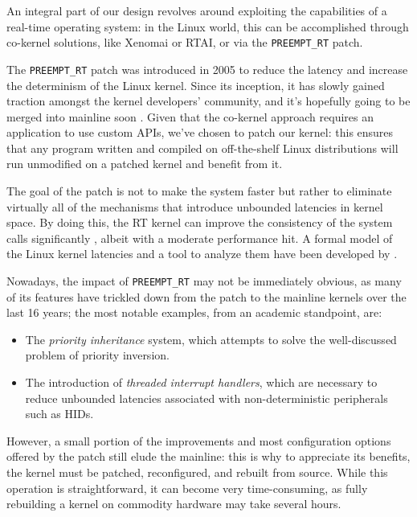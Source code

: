 \documentclass[a4paper,12pt]{report}
\begin{document}
An integral part of our design revolves around exploiting the capabilities of a real-time operating system: in the Linux world, this can be accomplished through co-kernel solutions, like Xenomai or RTAI, or via the \texttt{PREEMPT\_RT} patch.

The \texttt{PREEMPT\_RT} patch was introduced in 2005 to reduce the latency and increase the determinism of the Linux kernel. Since its inception, it has slowly gained traction amongst the kernel developers' community, and it's hopefully going to be merged into mainline soon \cite{lwn-rt-future}. Given that the co-kernel approach requires an application to use custom APIs, we've chosen to patch our kernel: this ensures that any program written and compiled on off-the-shelf Linux distributions will run unmodified on a patched kernel and benefit from it.

The goal of the patch is not to make the system faster but rather to eliminate virtually all of the mechanisms that introduce unbounded latencies in kernel space. By doing this, the RT kernel can improve the consistency of the system calls significantly \cite{dmoceri-benchmarking-rtlinux}, albeit with a moderate performance hit. A formal model of the Linux kernel latencies and a tool to analyze them have been developed by \textcite{demistifying-rt-latency}.

Nowadays, the impact of \texttt{PREEMPT\_RT} may not be immediately obvious, as many of its features have trickled down from the patch to the mainline kernels over the last 16 years; the most notable examples, from an academic standpoint, are:

\begin{itemize}
    \item The \textit{priority inheritance} system, which attempts to solve the well-discussed problem of priority inversion.
    \item The introduction of \textit{threaded interrupt handlers}, which are necessary to reduce unbounded latencies associated with non-deterministic peripherals such as HIDs.
\end{itemize}

However, a small portion of the improvements and most configuration options offered by the patch still elude the mainline: this is why to appreciate its benefits, the kernel must be patched, reconfigured, and rebuilt from source. While this operation is straightforward, it can become very time-consuming, as fully rebuilding a kernel on commodity hardware may take several hours.
\end{document}
